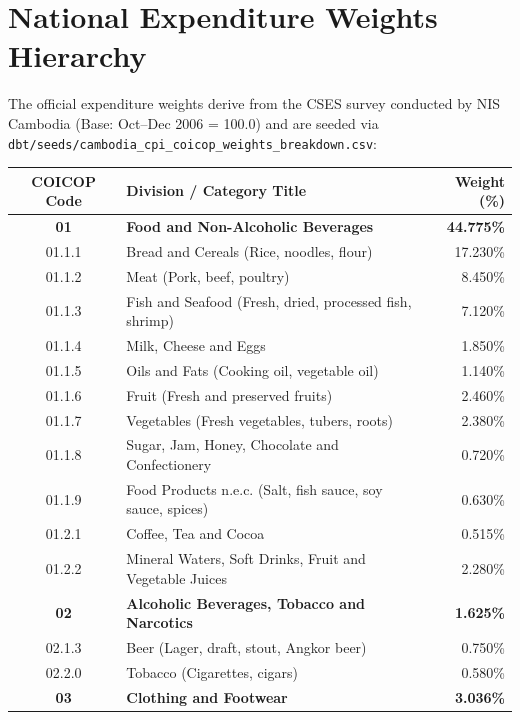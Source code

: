 \documentclass[11pt,a4paper]{article}
\begin{document}
\newpage

\section{National Expenditure Weights Hierarchy}

The official expenditure weights derive from the CSES survey conducted by NIS Cambodia (Base: Oct--Dec 2006 = 100.0) and are seeded via \texttt{dbt/seeds/cambodia\_cpi\_coicop\_weights\_breakdown.csv}:

\begin{longtable}{cp{8.5cm}r}
\toprule
\textbf{COICOP Code} & \textbf{Division / Category Title} & \textbf{Weight (\%)} \\
\midrule
\endhead
\textbf{01} & \textbf{Food and Non-Alcoholic Beverages} & \textbf{44.775\%} \\
01.1.1 & Bread and Cereals (Rice, noodles, flour) & 17.230\% \\
01.1.2 & Meat (Pork, beef, poultry) & 8.450\% \\
01.1.3 & Fish and Seafood (Fresh, dried, processed fish, shrimp) & 7.120\% \\
01.1.4 & Milk, Cheese and Eggs & 1.850\% \\
01.1.5 & Oils and Fats (Cooking oil, vegetable oil) & 1.140\% \\
01.1.6 & Fruit (Fresh and preserved fruits) & 2.460\% \\
01.1.7 & Vegetables (Fresh vegetables, tubers, roots) & 2.380\% \\
01.1.8 & Sugar, Jam, Honey, Chocolate and Confectionery & 0.720\% \\
01.1.9 & Food Products n.e.c. (Salt, fish sauce, soy sauce, spices) & 0.630\% \\
01.2.1 & Coffee, Tea and Cocoa & 0.515\% \\
01.2.2 & Mineral Waters, Soft Drinks, Fruit and Vegetable Juices & 2.280\% \\
\midrule
\textbf{02} & \textbf{Alcoholic Beverages, Tobacco and Narcotics} & \textbf{1.625\%} \\
02.1.3 & Beer (Lager, draft, stout, Angkor beer) & 0.750\% \\
02.2.0 & Tobacco (Cigarettes, cigars) & 0.580\% \\
\midrule
\textbf{03} & \textbf{Clothing and Footwear} & \textbf{3.036\%} \\

\end{longtable}
\end{document}
